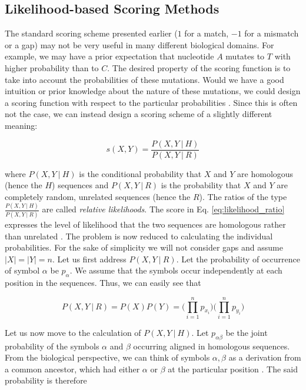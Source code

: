 \subsection{Likelihood-based Scoring Methods}
\label{sec:likelihood_scoring}
The standard scoring scheme presented earlier ($1$ for a match, $-1$ for a mismatch or a gap) may not be very useful in many different biological domains. For example, we may have a prior expectation that nucleotide $A$ mutates to $T$ with higher probability than to $C$. The desired property of the scoring function is to take into account the probabilities of these mutations. Would we have a good intuition or prior knowledge about the nature of these mutations, we could design a scoring function with respect to the particular probabilities \cite{Durbin1998}. Since this is often not the case, we can instead design a scoring scheme of a slightly different meaning:

\begin{equation}
s(X, Y) = \frac{P(X, Y ~|~ H)}{P(X, Y ~|~ R)}
\label{eq:likelihood_ratio}
\end{equation}


where $P(X, Y ~|~ H)$ is the conditional probability that $X$ and $Y$ are homologous (hence the $H$) sequences and $P(X, Y ~|~ R)$ is the probability that $X$ and $Y$ are completely random, unrelated sequences (hence the $R$). The ratios of the type $\frac{P(X, Y ~|~ H)}{P(X, Y ~|~ R)}$ are called \textit{relative likelihoods}. The score in Eq. \ref{eq:likelihood_ratio} expresses the level of likelihood that the two sequences are homologous  rather than unrelated \cite{Durbin1998}. The problem is now reduced to calculating the individual probabilities. For the sake of simplicity we will not consider gaps and assume $|X|=|Y|=n$. Let us first address $P(X, Y ~|~ R)$. Let the probability of occurrence of symbol $\alpha$ be $p_{\alpha}$. We assume that the symbols occur independently at each position in the sequences. Thus, we can easily see that

\begin{equation}
P(X, Y ~|~ R) = P(X)P(Y) = \Bigg( \prod_{i=1}^n p_{x_i} \Bigg) \Bigg( \prod_{i=1}^n p_{y_i} \Bigg)
\end{equation}

Let us now move to the calculation of $P(X, Y ~|~ H)$. Let $p_{\alpha \beta}$ be the joint probability of the symbols $\alpha$ and $\beta$ occurring aligned in homologous sequences. From the biological perspective, we can think of symbols $\alpha, \beta$ as a derivation from a common ancestor, which had either $\alpha$ or $\beta$ at the particular position \cite{Durbin1998}. The said probability is therefore

